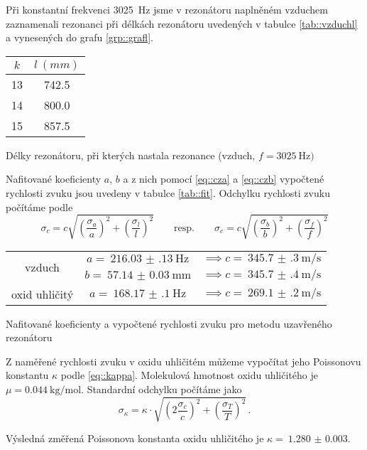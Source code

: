 Při konstantní frekvenci \SI{3025}{\Hz} jsme v rezonátoru naplněném vzduchem zaznamenali rezonanci při délkách rezonátoru uvedených v tabulce \ref{tab::vzduchl} a vynesených do grafu \ref{grp::grafl}.

\begin{tabulka}[htbp]
\centering
\begin{tabular}{cc}
$k$ & $l~(\si{mm})$ \\ \hline
13 & \num{742.5} \\
14 & \num{800.0} \\
15 & \num{857.5} \\
\end{tabular}
\caption{Délky rezonátoru, při kterých nastala rezonance (vzduch, $f=\SI{3025}{\Hz})$ }
\label{tab::vzduchl}
\end{tabulka}

Nafitované koeficienty $a$, $b$ a z nich pomocí \eqref{eq::cza} a \eqref{eq::czb} vypočtené rychlosti zvuku jsou uvedeny v tabulce \ref{tab::fit}. Odchylku rychlosti zvuku počítáme podle
\begin{equation}
\sigma_c = c \sqrt{ \left( \frac{\sigma_a}{a}   \right)^2
+ \left( \frac{\sigma_l}{l}   \right)^2 } 
\qquad \text{resp.} \qquad 
\sigma_c = c \sqrt{ \left( \frac{\sigma_b}{b}   \right)^2
+ \left( \frac{\sigma_f}{f}   \right)^2 }
\end{equation}


\begin{tabulka}[htbp]
\centering
\begin{tabular}{ccc}
\multirow{2}{*}{vzduch} & $a=~\SI{216.03(13)}{\Hz}$ & $\implies c=~\SI{345.7(3)}{\m\per\s}$ \\
& $b=~\SI{57.14(3)}{\mm}$ & $\implies c=~\SI{345.7(4)}{\m\per\s}$ \\ \hline
oxid uhličitý & $a=~\SI{168.17(10)}{\Hz}$ & $\implies c=~\SI{269.1(2)}{\m\per\s}$ \\
\end{tabular}
\caption{Nafitované koeficienty a vypočtené rychlosti zvuku pro metodu uzavřeného rezonátoru}
\label{tab::fit}
\end{tabulka}

Z naměřené rychlosti zvuku v oxidu uhličitém můžeme vypočítat jeho Poissonovu konstantu $\kappa$ podle \eqref{eq::kappa}.
Molekulová hmotnost oxidu uhličitého je $\mu=\SI{0.044}{\kg\per\mole}$.
Standardní odchylku počítáme jako
\begin{equation}
\sigma_\kappa = \kappa \cdot \sqrt{ \left(2\frac{\sigma_c}{c}\right)^2    +    \left( \frac{\sigma_T}{T} \right)^2} \,.
\end{equation}

Výsledná změřená Poissonova konstanta oxidu uhličitého je $\kappa =~\num{1.280(3)}$.